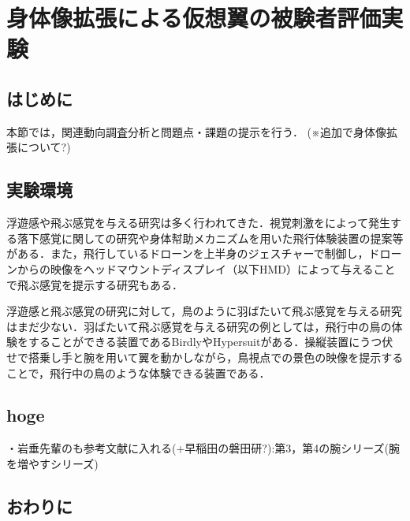 \chapter[身体像拡張による仮想翼の被験者評価実験]%
        {身体像拡張による仮想翼の被験者評価実験}

\section{はじめに}
        本節では，関連動向調査分析と問題点・課題の提示を行う．
        (※追加で身体像拡張について?)

\section{実験環境}
        浮遊感や飛ぶ感覚を与える研究は多く行われてきた．視覚刺激をによって発生する落下感覚に関しての研究\cite{奥川夏輝2017VR空間における視覚刺激によって発生する落下感覚の分析}や身体幇助メカニズムを用いた飛行体験装置の提案\cite{鈴木拓馬2014hmd}等がある．また，飛行しているドローンを上半身のジェスチャーで制御し，ドローンからの映像をヘッドマウントディスプレイ（以下HMD）によって与えることで飛ぶ感覚を提示する研究\cite{rognon2018flyjacket}もある．

        浮遊感と飛ぶ感覚の研究に対して，鳥のように羽ばたいて飛ぶ感覚を与える研究はまだ少ない．羽ばたいて飛ぶ感覚を与える研究の例としては，飛行中の鳥の体験をすることができる装置であるBirdly\cite{rheiner2014birdly}やHypersuit\cite{hypersuit}がある．操縦装置にうつ伏せで搭乗し手と腕を用いて翼を動かしながら，鳥視点での景色の映像を提示することで，飛行中の鳥のような体験できる装置である．


\section{hoge}        
        ・岩垂先輩のも参考文献に入れる(+早稲田の磐田研?):第3，第4の腕シリーズ(腕を増やすシリーズ) 

\section{おわりに}